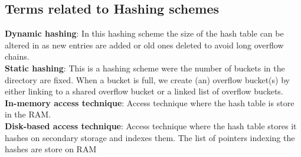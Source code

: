 \documentclass[a4paper,12pt, openany]{book}
\begin{document}
\begin{appendices}
	\section{Terms related to Hashing schemes} 
	\textbf{Dynamic hashing}: In this hashing scheme the size of the hash table can be altered in as new entries are added or old ones deleted to avoid long overflow chains.  \\
	\textbf{Static hashing}: \label{app:static}  This is a hashing scheme were the number of buckets in the directory are fixed. When a bucket is full, we create (an) overflow bucket(s) by either linking to a shared overflow bucket or a linked list of overflow buckets.\\
	\textbf{In-memory access technique}: Access technique where the hash table is store in the RAM.\\
	\textbf{Disk-based access technique}: Access technique where the hash table stores it hashes on secondary storage and indexes them. The list of pointers indexing the hashes are store on RAM

\end{appendices}
\end{document}
